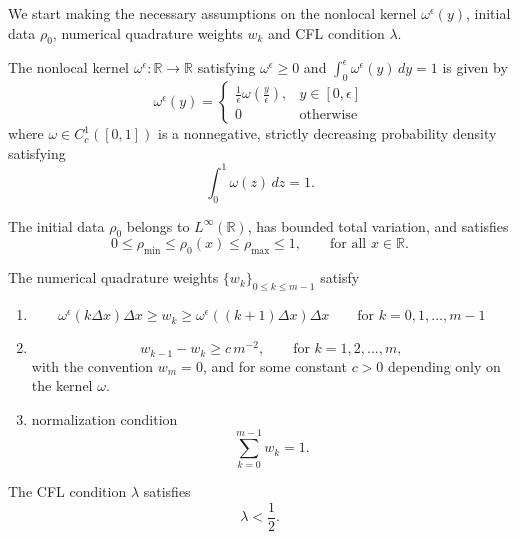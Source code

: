 We start making the necessary assumptions on the nonlocal kernel $\omega^{\epsilon}(y)$, initial data $\rho_0$, numerical quadrature weights $w_k$ and CFL condition $\lambda$.
\begin{assumption}\label{assm:assm_1}
    \leavevmode
    The nonlocal kernel $\omega^{\epsilon}: \mathbb{R} \rightarrow \mathbb{R}$ satisfying $\omega^{\epsilon} \geq 0$ and $\int_{0}^{\epsilon} \omega^{\epsilon}(y)  \, dy = 1$ is given by
    \[
        \omega^{\epsilon}(y) =
        \begin{cases}
            \frac{1}{\epsilon} \omega\!\left(\frac{y}{\epsilon}\right), & y \in [0,\epsilon] \\
            0                                                           & \text{otherwise}
        \end{cases}
    \]
    where $\omega \in C_{c}^1([0,1])$ is a nonnegative, strictly decreasing probability density satisfying
    \[
        \int_0^1 \omega(z)\,dz = 1.
    \]
\end{assumption}
\begin{assumption}\label{assm:assm_2}
    The initial data $\rho_0$ belongs to $L^\infty(\mathbb{R})$, has bounded total variation, and satisfies
    \[
        0\leq \rho_{\min} \leq \rho_0(x) \leq \rho_{\max} \le 1,
        \qquad \text{for all } x \in \mathbb{R}.
    \]
\end{assumption}

\begin{assumption}\label{assm:assm_3}
    The numerical quadrature weights $\{w_k\}_{0 \le k \le m-1}$ satisfy
    \begin{enumerate}
        \item
              \[
                  \omega^{\epsilon}(k\Delta x) \Delta x \ge w_k \ge \omega^{\epsilon}((k+1)\Delta x) \Delta x \qquad \text{for } k= 0,1, \dots, m-1
              \]
        \item
              \[
                  w_{k-1} - w_{k} \ge c\,m^{-2}, \qquad \text{for } k= 1,2, \dots, m,
              \]
              with the convention $w_m=0$, and for some constant $c>0$ depending only on the kernel $\omega$.
        \item normalization condition
              \[
                  \sum_{k=0}^{m-1} w_k = 1.
              \]
    \end{enumerate}
\end{assumption}

\begin{assumption}\label{assm:assm_4}
    The CFL condition $\lambda$  satisfies
    \[ \lambda < \frac{1}{2}.\]
\end{assumption}

